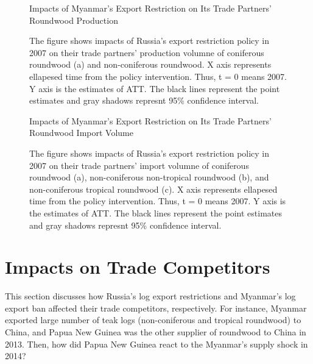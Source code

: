 \documentclass[a4paper,12pt]{article}
\begin{document}
\begin{figure}[H] 
    \centering
    \caption{Impacts of Myanmar's Export Restriction on Its Trade Partners' Roundwood Production}
    \caption*{\small{The figure shows impacts of Russia's export restriction policy in 2007 on their trade partners' production volumne of coniferous roundwood (a) and non-coniferous roundwood. X axis represents ellapesed time from the policy intervention. Thus, t = 0 means 2007. Y axis is the estimates of ATT. The black lines represent the point estimates and gray shadows represnt 95\% confidence interval.}}
    \label{fig:cf_prod_Myanmar}
\end{figure}

\begin{figure}[H] 
    \centering
    \caption{Impacts of Myanmar's Export Restriction on Its Trade Partners' Roundwood Import Volume}
    \caption*{\small{The figure shows impacts of Russia's export restriction policy in 2007 on their trade partners' import volumne of coniferous roundwood (a), non-coniferous non-tropical roundwood (b), and non-coniferous tropical roundwood (c). X axis represents ellapesed time from the policy intervention. Thus, t = 0 means 2007. Y axis is the estimates of ATT. The black lines represent the point estimates and gray shadows represnt 95\% confidence interval.}}
    \label{fig:cf_imp_Myanmar}
\end{figure}

\section{Impacts on Trade Competitors}
This section discusses how Russia's log export restrictions and Myanmar's log export ban affected their trade competitors, respectively. For instance, Myanmar exported large number of teak logs (non-coniferous and tropical roundwood) to China, and Papua New Guinea was the other supplier of roundwood to China in 2013. Then, how did Papua New Guinea react to the Myanmar's supply shock in 2014? 
\end{document}
